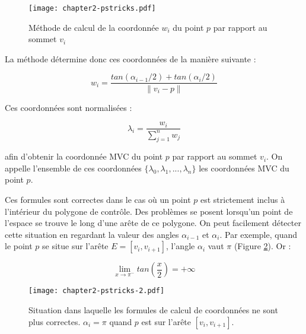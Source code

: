 \begin{figure}[ht]
  \begin{center}
    \texttt{[image: chapter2-pstricks.pdf]}
    \caption[Méthode de calcul MVC] {Méthode de calcul de la coordonnée $w_i$ du point $p$ par rapport
    au sommet $v_i$}
    \label{DEFcal}
  \end{center}
\end{figure}

La méthode détermine donc ces coordonnées de la manière suivante :

\begin{equation}
  w_i = \frac{tan(\alpha_{i-1}/2) + tan(\alpha_i/2)}{\| v_i - p \|}
  \label{DEFcoo}
\end{equation}

Ces coordonnées sont normalisées :

\begin{equation}
  \lambda_i = \frac{w_i}{\sum_{j=1}^n w_j}
\end{equation}

afin d'obtenir la coordonnée MVC du point $p$ par rapport au sommet $v_i$. On
appelle l'ensemble de ces coordonnées $\{\lambda_0, \lambda_1, ...,
\lambda_n\}$ les coordonnées MVC du point $p$.

Ces formules sont correctes dans le cas où un point $p$ est strictement inclus
à l'intérieur du polygone de contrôle. Des problèmes se posent lorsqu'un point
de l'espace se trouve le long d'une arête de ce polygone. On peut facilement
détecter cette situation en regardant la valeur des angles $\alpha_{i-1}$ et
$\alpha_i$. Par exemple, quand le point $p$ se situe sur l'arête $E =
[v_i,v_{i+1}]$, l'angle $\alpha_i$ vaut $\pi$ (Figure \ref{DEFinc}). Or :

\begin{displaymath}
  \lim\limits_{x \to \pi^-} tan(\frac{x}{2}) = +\infty
\end{displaymath}

\begin{figure}[ht]
  \begin{center}
    \texttt{[image: chapter2-pstricks-2.pdf]}

    \caption[Cas particulier MVC] {Situation dans laquelle les
formules de calcul de coordonnées ne sont plus correctes. $\alpha_i = \pi$
quand $p$ est sur l'arête $[v_i,v_{i+1}]$.}

    \label{DEFinc}
  \end{center}
\end{figure}

